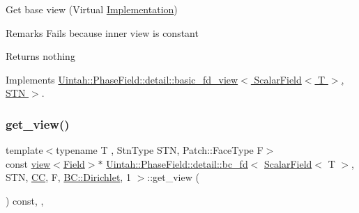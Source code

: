 Get base view (Virtual \hyperlink{classUintah_1_1PhaseField_1_1Implementation}{Implementation}) 

\begin{DoxyRemark}{Remarks}
Fails because inner view is constant
\end{DoxyRemark}
\begin{DoxyReturn}{Returns}
nothing 
\end{DoxyReturn}


Implements \hyperlink{classUintah_1_1PhaseField_1_1detail_1_1basic__fd__view_3_01ScalarField_3_01T_01_4_00_01STN_01_4_a2bbf870b332cfd997ec5297428019bc8}{Uintah\+::\+Phase\+Field\+::detail\+::basic\+\_\+fd\+\_\+view$<$ Scalar\+Field$<$ T $>$, S\+T\+N $>$}.

\mbox{\label{classUintah_1_1PhaseField_1_1detail_1_1bc__fd_3_01ScalarField_3_01T_01_4_00_01STN_00_01CC_00_01Fa77b2fd7fb77d0a4dc6c86c68d4ea0bc_a2199408e573e0a6f2cd86bb7fbd002a7}} 
\subsubsection{\texorpdfstring{get\+\_\+view()}{get\_view()}\hspace{0.1cm}{\footnotesize\ttfamily [2/2]}}
{\footnotesize\ttfamily template$<$typename T , Stn\+Type S\+TN, Patch\+::\+Face\+Type F$>$ \\
const \hyperlink{classUintah_1_1PhaseField_1_1detail_1_1view}{view}$<$\hyperlink{structUintah_1_1PhaseField_1_1ScalarField}{Field}$>$$\ast$ \hyperlink{classUintah_1_1PhaseField_1_1detail_1_1bc__fd}{Uintah\+::\+Phase\+Field\+::detail\+::bc\+\_\+fd}$<$ \hyperlink{structUintah_1_1PhaseField_1_1ScalarField}{Scalar\+Field}$<$ T $>$, S\+TN, \hyperlink{namespaceUintah_1_1PhaseField_a33d355affda78a83f45755ba8388cedda22303704507d024d1d6508ed9859a85a}{CC}, F, \hyperlink{namespaceUintah_1_1PhaseField_a148fba372aa3be96fd6eede7a2fa10b5abac152b762896edff34ed668ae1a546f}{B\+C\+::\+Dirichlet}, 1 $>$\+::get\+\_\+view (\begin{DoxyParamCaption}{ }\end{DoxyParamCaption}) const\hspace{0.3cm}{\ttfamily [inline]}, {\ttfamily [override]}, {\ttfamily [virtual]}}




